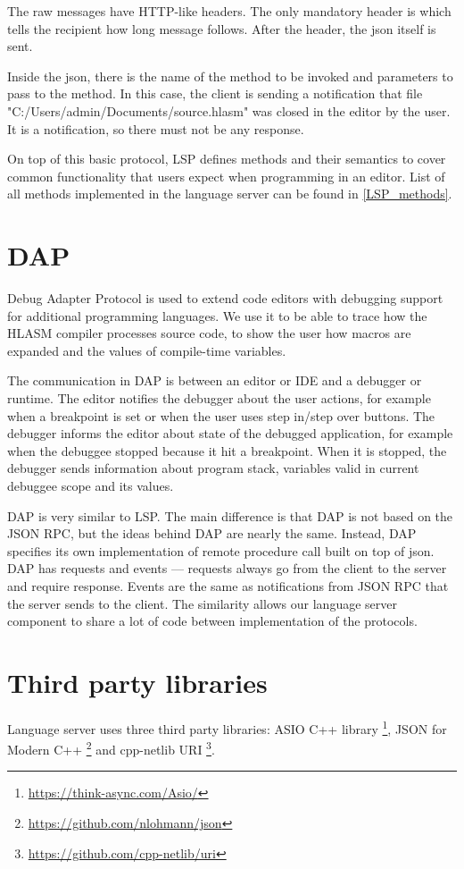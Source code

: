 The raw messages have HTTP-like headers. The only mandatory header is  which tells the recipient how long message follows. After the header, the json itself is sent.

Inside the json, there is the name of the method to be invoked and parameters to pass to the method. In this case, the client is sending a notification that file "C:/Users/admin/Documents/source.hlasm" was closed in the editor by the user. It is a notification, so there must not be any response.

On top of this basic protocol, LSP defines methods and their semantics to cover common functionality that users expect when programming in an editor. List of all methods implemented in the language server can be found in \cref{LSP_methods}.

\section{DAP}
Debug Adapter Protocol is used to extend code editors with debugging support for additional programming languages. We use it to be able to trace how the HLASM compiler processes source code, to show the user how macros are expanded and the values of compile-time variables.

The communication in DAP is between an editor or IDE and a debugger or runtime. The editor notifies the debugger about the user actions, for example when a breakpoint is set or when the user uses step in/step over buttons. The debugger informs the editor about state of the debugged application, for example when the debuggee stopped because it hit a breakpoint. When it is stopped, the debugger sends information about program stack, variables valid in current debuggee scope and its values.

DAP is very similar to LSP. The main difference is that DAP is not based on the JSON RPC, but the ideas behind DAP are nearly the same. Instead, DAP specifies its own implementation of remote procedure call built on top of json. DAP has requests and events ---  requests always go from the client to the server and require response. Events are the same as notifications from JSON RPC that the server sends to the client. The similarity allows our language server component to share a lot of code between implementation of the protocols.

\section{Third party libraries}
Language server uses three third party libraries: ASIO C++ library \footnote{\url{https://think-async.com/Asio/}}, JSON for Modern C++ \footnote{\url{https://github.com/nlohmann/json}} and 
cpp-netlib URI \footnote{\url{https://github.com/cpp-netlib/uri}}.

